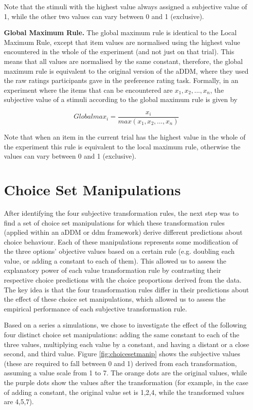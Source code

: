 \documentclass[11pt,a4paper]{article}
\begin{document}
Note that the stimuli with the highest value always assigned a subjective value of 1, while the other two values can vary between 0 and 1 (exclusive).

\textbf{Global Maximum Rule.} The global maximum rule is identical to the Local Maximum Rule, except that item values are normalised using the highest value encountered in the whole of the experiment (and not just on that trial). This means that all values are normalised by the same constant, therefore, the global maximum rule is equivalent to the original version of the aDDM, where they used the raw ratings participants gave in the preference rating task. Formally, in an experiment where the items that can be encountered are $x_1, x_2, ..., x_n$, the subjective value of a stimuli according to the global maximum rule is given by

\begin{equation}
Globalmax_{i}=\frac{x_i}{max(x_1,x_2,...,x_n)}
\label{eq:globmax}
\end{equation}

Note that when an item in the current trial has the highest value in the whole of the experiment this rule is equivalent to the local maximum rule, otherwise the values can vary between 0 and 1 (exclusive). 

\section{Choice Set Manipulations} \label{chap1choicesetman}

After identifying the four subjective transformation rules, the next step was to find a set of choice set manipulations for which these transformation rules (applied within an aDDM or ddm framework) derive different predictions about choice behaviour. Each of these manipulations represents some modification of the three options' objective values based on a certain rule (e.g. doubling each value, or adding a constant to each of them). This allowed us to assess the explanatory power of each value transformation rule by contrasting their respective choice predictions with the choice proportions derived from the data. The key idea is that the four transformation rules differ in their predictions about the effect of these choice set manipulations, which allowed us to assess the empirical performance of each subjective transformation rule.

Based on a series a simulations, we chose to investigate the effect of the following four distinct choice set manipulations: adding the same constant to each of the three values, multiplying each value by a constant, and having a distant or a close second, and third value. Figure \ref{fig:choicesetmanip} shows the subjective values (these are required to fall between 0 and 1) derived from each transformation, assuming a value scale from 1 to 7. The orange dots are the original values, while the purple dots show the values after the transformation (for example, in the case of adding a constant, the original value set is 1,2,4, while the transformed values are 4,5,7).
\end{document}
